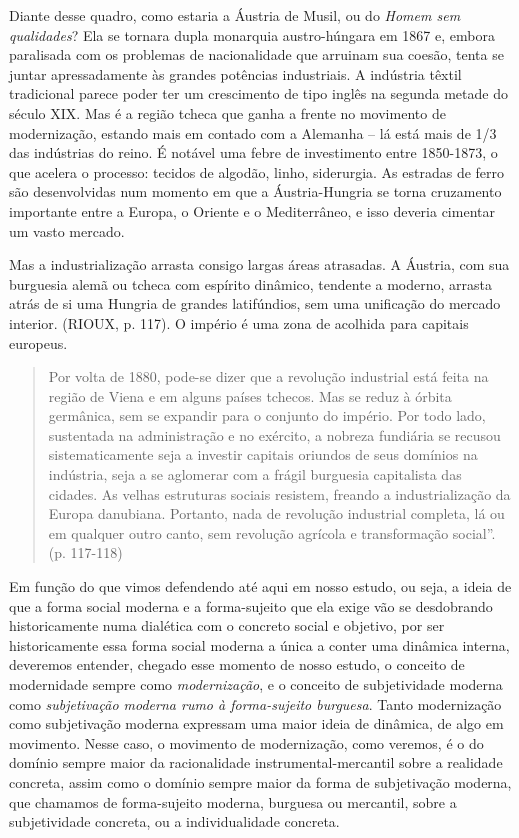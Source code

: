 Diante desse quadro, como estaria a Áustria de Musil, ou do \emph{Homem
sem qualidades}? Ela se tornara dupla monarquia austro-húngara em 1867
e, embora paralisada com os problemas de nacionalidade que arruinam sua
coesão, tenta se juntar apressadamente às grandes potências industriais.
A indústria têxtil tradicional parece poder ter um crescimento de tipo
inglês na segunda metade do século XIX. Mas é a região tcheca que ganha
a frente no movimento de modernização, estando mais em contado com a
Alemanha -- lá está mais de 1/3 das indústrias do reino. É notável uma
febre de investimento entre 1850-1873, o que acelera o processo: tecidos
de algodão, linho, siderurgia. As estradas de ferro são desenvolvidas
num momento em que a Áustria-Hungria se torna cruzamento importante
entre a Europa, o Oriente e o Mediterrâneo, e isso deveria cimentar um
vasto mercado.

Mas a industrialização arrasta consigo largas áreas atrasadas. A
Áustria, com sua burguesia alemã ou tcheca com espírito dinâmico,
tendente a moderno, arrasta atrás de si uma Hungria de grandes
latifúndios, sem uma unificação do mercado interior. (RIOUX, p. 117). O
império é uma zona de acolhida para capitais europeus.

\begin{quote}
Por volta de 1880, pode-se dizer que a revolução industrial está feita
na região de Viena e em alguns países tchecos. Mas se reduz à órbita
germânica, sem se expandir para o conjunto do império. Por todo lado,
sustentada na administração e no exército, a nobreza fundiária se
recusou sistematicamente seja a investir capitais oriundos de seus
domínios na indústria, seja a se aglomerar com a frágil burguesia
capitalista das cidades. As velhas estruturas sociais resistem, freando
a industrialização da Europa danubiana. Portanto, nada de revolução
industrial completa, lá ou em qualquer outro canto, sem revolução
agrícola e transformação social''. (p. 117-118)
\end{quote}

Em função do que vimos defendendo até aqui em nosso estudo, ou seja, a
ideia de que a forma social moderna e a forma-sujeito que ela exige vão
se desdobrando historicamente numa dialética com o concreto social e
objetivo, por ser historicamente essa forma social moderna a única a
conter uma dinâmica interna, deveremos entender, chegado esse momento de
nosso estudo, o conceito de modernidade sempre como \emph{modernização},
e o conceito de subjetividade moderna como \emph{subjetivação moderna
rumo à forma-sujeito burguesa}. Tanto modernização como subjetivação
moderna expressam uma maior ideia de dinâmica, de algo em movimento.
Nesse caso, o movimento de modernização, como veremos, é o do domínio
sempre maior da racionalidade instrumental-mercantil sobre a realidade
concreta, assim como o domínio sempre maior da forma de subjetivação
moderna, que chamamos de forma-sujeito moderna, burguesa ou mercantil,
sobre a subjetividade concreta, ou a individualidade concreta.

